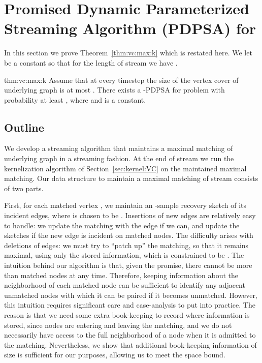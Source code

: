 \documentclass[11pt,letter]{article}
\begin{document}
\section{Promised Dynamic Parameterized Streaming Algorithm (PDPSA) for }
\label{sec:promised:dynamic}
In this section we prove Theorem~\ref{thm:vc:max:k} which is restated here.
We let  be a constant so that for the length of stream  we have .

\begin{reptheorem}{thm:vc:max:k}
Assume that at every timestep
the size of the vertex cover of underlying graph  is at most .
There exists a -PDPSA for  problem with probability at least ,
where  and  is a constant.
\end{reptheorem}



\subsection{Outline}
We develop a streaming algorithm that maintains a maximal matching of underlying graph 
in a streaming fashion.
At the end of stream  we run the kernelization algorithm of Section~\ref{sec:kernel:VC}
on the maintained maximal matching.
Our data structure to maintain a maximal matching  of stream  consists of two parts.

First, for each matched vertex , we maintain an -sample recovery sketch
 of its incident edges, where
 is chosen to be .
Insertions of new edges are relatively easy to handle: we update the
matching with the edge if we can, and update the sketches if the new
edge is incident on matched nodes.
The difficulty arises with deletions of edges: we must try to ``patch
up'' the matching, so that it remains maximal, using only the stored
information, which is constrained to be .
The intuition behind our algorithm is that, given the promise, there
cannot be more than  matched nodes at any time.
Therefore, keeping  information about the
neighborhood of each matched node can be sufficient to identify any
adjacent unmatched nodes with which it can be paired if it becomes
unmatched.
However, this intuition requires significant care and case-analysis to
put into practice.
The reason is that we need some extra book-keeping to record where
information is stored, since nodes are entering and leaving the
matching, and we do not necessarily have access to the full
neighborhood of a node when it is admitted to the matching.
Nevertheless, we show that additional book-keeping information of size
 is sufficient for our purposes, allowing us to meet the
 space bound.
\end{document}
